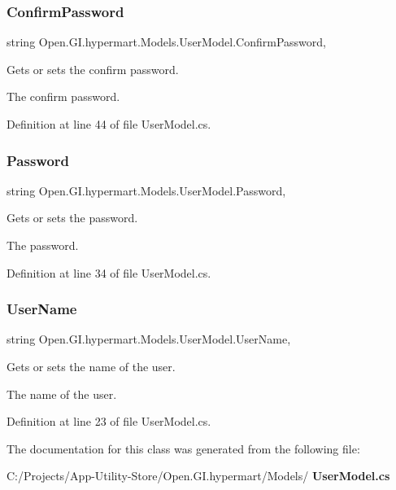 \subsubsection{Confirm\+Password}
{\footnotesize\ttfamily string Open.\+G\+I.\+hypermart.\+Models.\+User\+Model.\+Confirm\+Password\hspace{0.3cm}{\ttfamily [get]}, {\ttfamily [set]}}



Gets or sets the confirm password. 

The confirm password. 

Definition at line 44 of file User\+Model.\+cs.

\mbox{\label{class_open_1_1_g_i_1_1hypermart_1_1_models_1_1_user_model_a7444f518307d0a5ee95b237243a26247}} 
\subsubsection{Password}
{\footnotesize\ttfamily string Open.\+G\+I.\+hypermart.\+Models.\+User\+Model.\+Password\hspace{0.3cm}{\ttfamily [get]}, {\ttfamily [set]}}



Gets or sets the password. 

The password. 

Definition at line 34 of file User\+Model.\+cs.

\mbox{\label{class_open_1_1_g_i_1_1hypermart_1_1_models_1_1_user_model_aa873e73ce7a4470c31e78f7cc86c25ad}} 
\subsubsection{User\+Name}
{\footnotesize\ttfamily string Open.\+G\+I.\+hypermart.\+Models.\+User\+Model.\+User\+Name\hspace{0.3cm}{\ttfamily [get]}, {\ttfamily [set]}}



Gets or sets the name of the user. 

The name of the user. 

Definition at line 23 of file User\+Model.\+cs.



The documentation for this class was generated from the following file\+:\begin{DoxyCompactItemize}
\item 
C\+:/\+Projects/\+App-\/\+Utility-\/\+Store/\+Open.\+G\+I.\+hypermart/\+Models/\textbf{ User\+Model.\+cs}\end{DoxyCompactItemize}
